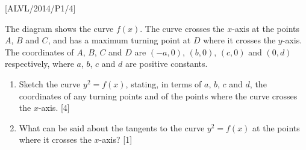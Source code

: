 \item {[}ALVL/2014/P1/4{]}

The diagram shows the curve $f\left(x\right)$. The curve crosses
the $x$-axis at the points $A$, $B$ and $C$, and has a maximum
turning point at $D$ where it crosses the $y$-axis. The coordinates
of $A$, $B$, $C$ and $D$ are $\left(-a,0\right)$, $\left(b,0\right)$,
$\left(c,0\right)$ and $\left(0,d\right)$ respectively, where $a$,
$b$, $c$ and $d$ are positive constants.
\begin{enumerate}
\item Sketch the curve $y^{2}=f\left(x\right)$, stating, in terms of $a$,
$b$, $c$ and $d$, the coordinates of any turning points and of
the points where the curve crosses the $x$-axis.\hfill{} {[}4{]}
\item What can be said about the tangents to the curve $y^{2}=f\left(x\right)$
at the points where it crosses the $x$-axis?\hfill{} {[}1{]}
\end{enumerate}
